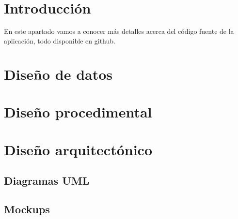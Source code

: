 
\section{Introducción}\label{introduccion-diseño}
En este apartado vamos a conocer más detalles acerca del código fuente de la aplicación, todo disponible en github. 

\section{Diseño de datos}\label{diseno-fatos}

\section{Diseño procedimental}\label{diseno-procedimental}

\section{Diseño arquitectónico}\label{diseno-arquitectura}

\subsection{Diagramas UML}\label{diagramas-uml}

\subsection{Mockups}\label{Mockups}




